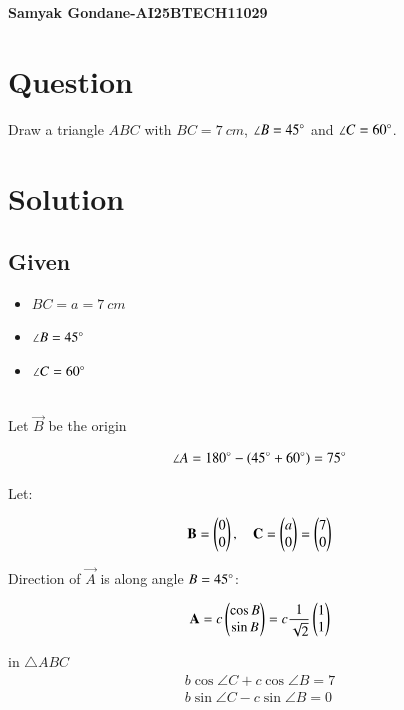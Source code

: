 \documentclass{article}
\begin{document}
\begin{center}
\large
    \textbf{Samyak Gondane-AI25BTECH11029}
\end{center}
\date{}

\section*{Question}
Draw a triangle $ABC$ with $BC = 7\ cm$, $\angle B = 45\degree$ and $\angle C = 60\degree$.

\section*{Solution}


\subsection*{Given}
\begin{itemize}
    \item $BC = a = 7\ cm$
    \item $\angle B = 45\degree$
    \item $\angle C = 60\degree$
\end{itemize}
\\
Let $\vec{B}$ be the origin

\begin{align}
\angle A = 180\degree - (45\degree + 60\degree) = 75\degree
\end{align}




Let:


\begin{align}
\mathbf{B} = \begin{pmatrix}0 \\ 0\end{pmatrix}, \quad
\mathbf{C} = \begin{pmatrix}a \\ 0\end{pmatrix} = \begin{pmatrix}7 \\ 0\end{pmatrix}
\end{align}



Direction of $\vec{A}$ is along angle $B = 45\degree$:


\begin{align}
\mathbf{A} = c \begin{pmatrix}\cos B \\ \sin B\end{pmatrix}
= c \frac{1}{\sqrt{2}} \begin{pmatrix}1 \\ 1\end{pmatrix}
\end{align}

in $\triangle ABC$
\begin{align}
    b \cos \angle C + c \cos \angle B = 7\\
    b \sin \angle C - c \sin \angle B = 0
\end{align}
\end{document}
